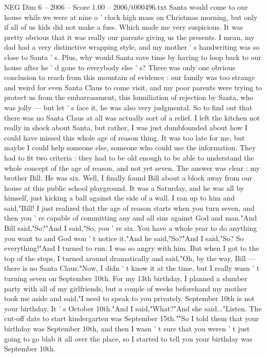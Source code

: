 \begin{textsample}{NEG Dim 6 – 2006 – Score 1.00 – 2006/t000496.txt}
Santa would come to our house while we were at nine o ' clock high mass on Christmas morning, but only if all of us kids did not make a fuss.
Which made me very suspicious.
It was pretty obvious that it was really our parents giving us the presents.
I mean, my dad had a very distinctive wrapping style, and my mother ' s handwriting was so close to Santa ' s.
Plus, why would Santa save time by having to loop back to our house after he ' d gone to everybody else ' s?
There was only one obvious conclusion to reach from this mountain of evidence : our family was too strange and weird for even Santa Claus to come visit, and my poor parents were trying to protect us from the embarrassment, this humiliation of rejection by Santa, who was jolly — but let ' s face it, he was also very judgmental.
So to find out that there was no Santa Claus at all was actually sort of a relief.
I left the kitchen not really in shock about Santa, but rather, I was just dumbfounded about how I could have missed this whole age of reason thing.
It was too late for me, but maybe I could help someone else, someone who could use the information.
They had to fit two criteria : they had to be old enough to be able to understand the whole concept of the age of reason, and not yet seven.
The answer was clear : my brother Bill.
He was six.
Well, I finally found Bill about a block away from our house at this public school playground.
It was a Saturday, and he was all by himself, just kicking a ball against the side of a wall.
I ran up to him and said,"Bill!
I just realized that the age of reason starts when you turn seven, and then you ' re capable of committing any and all sins against God and man."And Bill said,"So?"And I said,"So, you ' re six.
You have a whole year to do anything you want to and God won ' t notice it."And he said,"So?"And I said,"So?
So everything!"And I turned to run.
I was so angry with him.
But when I got to the top of the steps, I turned around dramatically and said,"Oh, by the way, Bill — there is no Santa Claus."Now, I didn ' t know it at the time, but I really wasn ' t turning seven on September 10th.
For my 13th birthday, I planned a slumber party with all of my girlfriends, but a couple of weeks beforehand my mother took me aside and said,"I need to speak to you privately.
September 10th is not your birthday.
It ' s October 10th."And I said,"What?"And she said..."Listen.
The cut-off date to start kindergarten was September 15th.""So I told them that your birthday was September 10th, and then I wasn ' t sure that you weren ' t just going to go blab it all over the place, so I started to tell you your birthday was September 10th.

\end{textsample}
